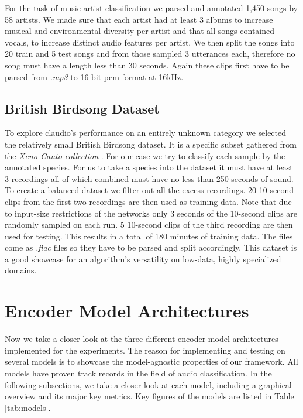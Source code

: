 For the task of music artist classification we parsed and annotated 1,450 songs by 58 artists. We made sure that each artist had at least 3 albums to increase musical and environmental diversity per artist and that all songs contained vocals, to increase distinct audio features per artist. We then split the songs into 20 train and 5 test songs and from those sampled 3 utterances each, therefore no song must have a length less than 30 seconds. Again these clips first have to be parsed from \textit{.mp3} to 16-bit \gls{pcm} format at 16kHz.

\subsection{British Birdsong Dataset}

To explore \gls{claudio}’s performance on an entirely unknown category we selected the relatively small British Birdsong dataset. It is a specific subset gathered from the \textit{Xeno Canto collection} \cite{stowell2014xccoverbl}. For our case we try to classify each sample by the annotated species. For us to take a species into the dataset it must have at least 3 recordings all of which combined must have no less than 250 seconds of sound. To create a balanced dataset we filter out all the excess recordings. 20 10-second clips from the first two recordings are then used as training data. Note that due to input-size restrictions of the networks only 3 seconds of the 10-second clips are randomly sampled on each run. 5 10-second clips of the third recording are then used for testing. This results in a total of 180 minutes of training data. The files come as \textit{.flac} files so they have to be parsed and split accordingly. This dataset is a good showcase for an algorithm's versatility on low-data, highly specialized domains.

\section{Encoder Model Architectures}

Now we take a closer look at the three different encoder model architectures implemented for the experiments. The reason for implementing and testing on several models is to showcase the model-agnostic properties of our framework. All models have proven track records in the field of audio classification. In the following subsections, we take a closer look at each model, including a graphical overview and its major key metrics. Key figures of the models are listed in Table \ref{tab:models}.

